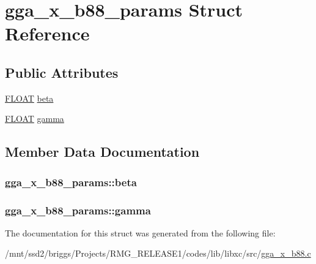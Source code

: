 \hypertarget{structgga__x__b88__params}{\section{gga\-\_\-x\-\_\-b88\-\_\-params Struct Reference}
\label{structgga__x__b88__params}
}
\subsection*{Public Attributes}
\begin{DoxyCompactItemize}
\item 
\hyperlink{src_2xc__config_8h_ae8690abbffa85934d64d545920e2b108}{F\-L\-O\-A\-T} \hyperlink{structgga__x__b88__params_acd2f5cd0dd2cd1a0c2e68defce61f4a1}{beta}
\item 
\hyperlink{src_2xc__config_8h_ae8690abbffa85934d64d545920e2b108}{F\-L\-O\-A\-T} \hyperlink{structgga__x__b88__params_abf56fc5e5e139247ce200f899cf2a732}{gamma}
\end{DoxyCompactItemize}


\subsection{Member Data Documentation}
\hypertarget{structgga__x__b88__params_acd2f5cd0dd2cd1a0c2e68defce61f4a1}{
\subsubsection[{beta}]{ gga\-\_\-x\-\_\-b88\-\_\-params\-::beta}}\label{structgga__x__b88__params_acd2f5cd0dd2cd1a0c2e68defce61f4a1}
\hypertarget{structgga__x__b88__params_abf56fc5e5e139247ce200f899cf2a732}{
\subsubsection[{gamma}]{ gga\-\_\-x\-\_\-b88\-\_\-params\-::gamma}}\label{structgga__x__b88__params_abf56fc5e5e139247ce200f899cf2a732}


The documentation for this struct was generated from the following file\-:\begin{DoxyCompactItemize}
\item 
/mnt/ssd2/briggs/\-Projects/\-R\-M\-G\-\_\-\-R\-E\-L\-E\-A\-S\-E1/codes/lib/libxc/src/\hyperlink{gga__x__b88_8c}{gga\-\_\-x\-\_\-b88.\-c}\end{DoxyCompactItemize}
